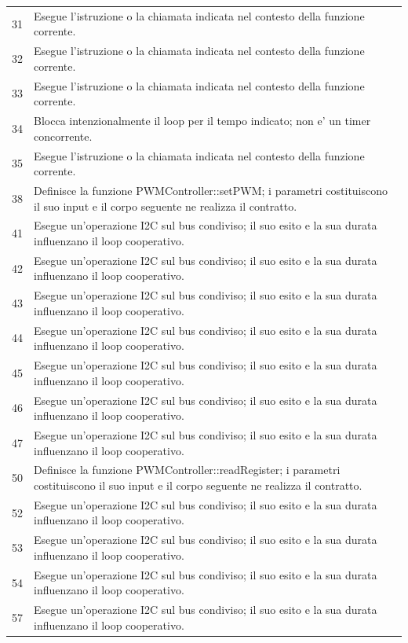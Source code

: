 \documentclass[11pt,a4paper]{article}
\begin{document}
\begin{longtable}{p{}p{}}
31 & Esegue l'istruzione o la chiamata indicata nel contesto della funzione corrente. \\
32 & Esegue l'istruzione o la chiamata indicata nel contesto della funzione corrente. \\
33 & Esegue l'istruzione o la chiamata indicata nel contesto della funzione corrente. \\
34 & Blocca intenzionalmente il loop per il tempo indicato; non e' un timer concorrente. \\
35 & Esegue l'istruzione o la chiamata indicata nel contesto della funzione corrente. \\
38 & Definisce la funzione PWMController::setPWM; i parametri costituiscono il suo input e il corpo seguente ne realizza il contratto. \\
41 & Esegue un'operazione I2C sul bus condiviso; il suo esito e la sua durata influenzano il loop cooperativo. \\
42 & Esegue un'operazione I2C sul bus condiviso; il suo esito e la sua durata influenzano il loop cooperativo. \\
43 & Esegue un'operazione I2C sul bus condiviso; il suo esito e la sua durata influenzano il loop cooperativo. \\
44 & Esegue un'operazione I2C sul bus condiviso; il suo esito e la sua durata influenzano il loop cooperativo. \\
45 & Esegue un'operazione I2C sul bus condiviso; il suo esito e la sua durata influenzano il loop cooperativo. \\
46 & Esegue un'operazione I2C sul bus condiviso; il suo esito e la sua durata influenzano il loop cooperativo. \\
47 & Esegue un'operazione I2C sul bus condiviso; il suo esito e la sua durata influenzano il loop cooperativo. \\
50 & Definisce la funzione PWMController::readRegister; i parametri costituiscono il suo input e il corpo seguente ne realizza il contratto. \\
52 & Esegue un'operazione I2C sul bus condiviso; il suo esito e la sua durata influenzano il loop cooperativo. \\
53 & Esegue un'operazione I2C sul bus condiviso; il suo esito e la sua durata influenzano il loop cooperativo. \\
54 & Esegue un'operazione I2C sul bus condiviso; il suo esito e la sua durata influenzano il loop cooperativo. \\
57 & Esegue un'operazione I2C sul bus condiviso; il suo esito e la sua durata influenzano il loop cooperativo. \\

\end{longtable}
\end{document}
